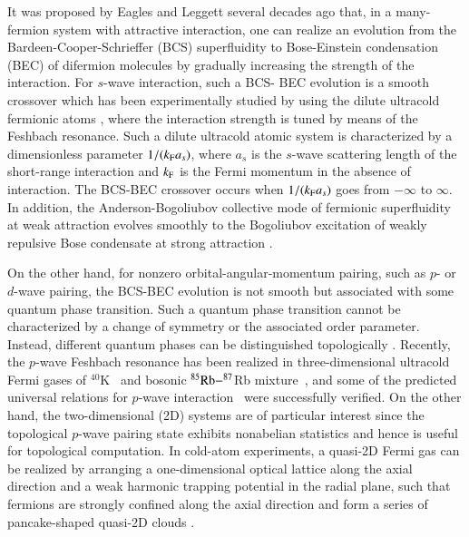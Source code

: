 \documentclass[aps,prd,amsmath,two column,nofootinbib,amssymb,referee]{revtex4}
\begin{document}
It was proposed by Eagles \cite{Eagles1969} and Leggett \cite{Leggett1980} several decades ago that,  in a
many-fermion system with attractive interaction, one can realize an evolution from the Bardeen-Cooper-Schrieffer (BCS) superfluidity to Bose-Einstein condensation (BEC) of difermion molecules by gradually increasing the strength of the interaction. For $s$-wave interaction, such a BCS- BEC evolution is a smooth crossover \cite{Nozieres1985,SadeMelo1993,Engelbrecht1997,Randeria1989,Randeria1990,Loktev2001,Chen2005,Giorgini2008,Gurarie2007} which has been experimentally studied by using the dilute ultracold fermionic atoms \cite{Greiner2003,Jochim2003,Zwierlein2003}, where the interaction strength is tuned by means of the Feshbach resonance. Such a dilute ultracold atomic system is characterized by a dimensionless parameter $1/(k_{\rm F}a_s)$, where $a_s$ is the $s$-wave scattering length of the short-range interaction and $k_{\rm F}$ is the Fermi momentum in the absence of interaction. The BCS-BEC crossover occurs when $1/(k_{\rm F}a_s)$ goes from $-\infty$ to $\infty$. In addition, the Anderson-Bogoliubov collective mode of fermionic superfluidity at weak attraction evolves smoothly to the Bogoliubov excitation of weakly repulsive Bose condensate at strong attraction \cite{Engelbrecht1997,Gurarie2007,Combescot2006,Belkhir1992,Belkhir1994}.

On the other hand, for nonzero orbital-angular-momentum pairing, such as $p$- or $d$-wave pairing, the BCS-BEC evolution is not smooth but associated with some quantum phase transition\cite{Read2000,Botelho2005a,Botelho2005b,Gurarie2005,Cheng2005,Iskin2006a,Iskin2006b,Cao2013}. Such a quantum phase transition cannot be characterized by a change of symmetry or the associated order parameter. Instead, different quantum phases can be distinguished topologically \cite{Read2000}. Recently, the $p$-wave Feshbach resonance has been realized in three-dimensional ultracold Fermi gases of $^{40}$K~\cite{Luciuk2016} and bosonic $^{85}{\rm Rb}-^{87}$Rb mixture~\cite{Dong2016}, and some of the predicted universal relations for $p$-wave interaction~\cite{Yoshida2015,Yu2015} were successfully verified. On the other hand, the two-dimensional (2D) systems are of particular interest since the topological $p$-wave pairing state exhibits nonabelian statistics \cite{Read2000} and hence is useful for topological computation. In cold-atom experiments, a quasi-2D Fermi gas can be realized by arranging a one-dimensional optical lattice along the axial direction and a weak harmonic trapping potential in the radial plane, such that fermions are strongly confined along the axial direction and form a series of pancake-shaped quasi-2D clouds \cite{2Dexp1,2Dexp2,2Dexp3,2Dexp4,2Dexp5}.
\end{document}
